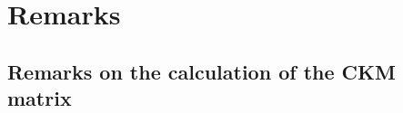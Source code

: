 \documentclass[12pt,a4paper,twoside]{scrartcl}
\newcommand{\function}[1]{{\tt #1}}
\DeclareMathOperator{\im}{Im}
\numberwithin{equation}{section}
\numberwithin{table}{section}
\begin{document}

% 
% 
% 
% 
% 

\section{Remarks}

\subsection{Remarks on the calculation of the CKM matrix}
\end{document}
